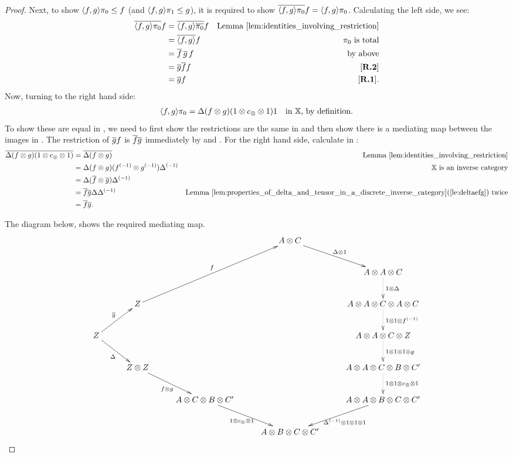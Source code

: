 \begin{proof}
  Next, to show $\langle f,g\rangle \pi_0 \le f$ (and $\langle f,g\rangle \pi_1 \le g$), it is required to show
  $\overline{\langle f,g\rangle\pi_{0}} f = \langle f,g\rangle \pi_{0}$. Calculating the left side, we see:
  \begin{align*}
    \overline{\langle f,g\rangle\pi_{0}} f &=\overline{\langle f,g\rangle\overline{\pi_{0}}} f &\text{Lemma \ref{lem:identities_involving_restriction}}\\
    &=\overline{\langle f,g\rangle} f &\pi_{0}\text{ is total}\\
    &=\overline{f}\,\overline{g}\, f&\text{ by above}\\
    &=\overline{g} \overline{f} f & [\text{\bfseries {R}.{2}}]\\
    &=\overline{g} f& [\text{\bfseries {R}.{1}}].
  \end{align*}
  Now, turning to the right hand side:
  \begin{align*}
    \langle f,g\rangle\pi_{0} &= \Delta(f\otimes g)(1\otimes c_{\otimes}\otimes1) 1 &\text{in \ensuremath{\mathbb{X}}, by definition.}
  \end{align*}
  To show these are equal in \Xt, we need to first show the restrictions are the same in \X and
  then show there is a mediating map between the images in \X. The restriction of $\overline{g} f$ is
  $\overline{f} \overline{g}$ immediately by \rthree and \rtwo. For the right hand side, calculate in \X:
  \begin{align*}
    \overline{\Delta(f\otimes g)(1\otimes c_{\otimes}\otimes1)}
      & = \overline{\Delta(f\otimes g)} & \text{Lemma  \ref{lem:identities_involving_restriction}}\\
    & = \Delta(f\otimes g)({f}^{(-1)} \otimes {g}^{(-1)}){\Delta}^{(-1)} & \mathbb{X} \text{ is an inverse category}\\
    & = \Delta(\overline{f} \otimes \overline{g}){\Delta}^{(-1)} & \\
    & = \overline{f} \overline{g} \Delta{\Delta}^{(-1)} & \text{Lemma \ref{lem:properties_of_delta_and_tensor_in_a_discrete_inverse_category}(\ref{le:deltaefg}) twice}\\
    & = \overline{f} \overline{g}.
  \end{align*}

  The diagram below, shows the required mediating map.
  \[
    \xymatrix @C=27pt @R=25pt{
      & & & A \* C \ar[dr]^{\Delta\*1}\\
      & & & & A \* A \* C \ar@{.>}[d]^{1\*\Delta}\\
      &Z\ar[uurr]^{f}& & & A \* A\* C \* A \* C\ar@{.>}[d]^{1\*1\*\inv{f}}\\
      Z\ar[ur]^{\rst{g}}\ar[dr]_{\Delta}&& & &  A \* A \*C \* Z \ar@{.>}[d]^{1 \* 1 \* 1 \* g}\\
      &Z\*Z\ar[dr]_{f\* g}& & & A\*A\*C\*B\*C'\ar@{.>}[d]^{1\*1\*c_{\*}\*1}\\
      &&A\*C\*B\* C'\ar[dr]_{1\*c_{\*}\*1}&&A\*A\*B\*C\*C'\ar[dl]^{\inv{\Delta}\*1\*1\*1}\\
      & & & A\*B\*C\*C'
    }
  \]
\end{proof}

